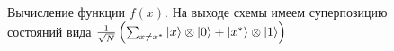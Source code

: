 \begin{figure}
\centering



\caption{Вычисление функции $f\left(x\right)$. На выходе схемы имеем
  суперпозицию  состояний вида 
$\frac{1}{\sqrt{N}}\left(
 \sum_{x \ne x^{\ast}} \ket{x}\otimes\ket{0}
+ \left|x^{\ast}\right>\otimes\ket{1}
\right)$}
\label{figQuantCompGrover1}
\end{figure}
